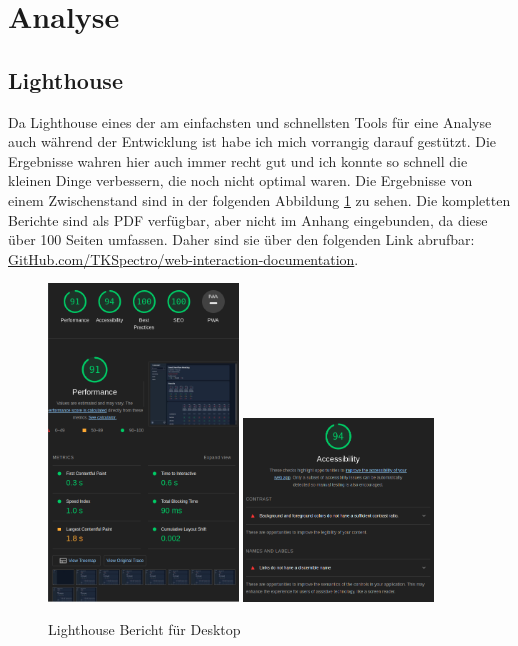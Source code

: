 \section{Analyse}

\subsection{Lighthouse}

Da Lighthouse eines der am einfachsten und schnellsten Tools für eine Analyse auch während der Entwicklung ist habe ich mich vorrangig darauf gestützt. Die Ergebnisse wahren hier auch immer recht gut und ich konnte so schnell die kleinen Dinge verbessern, die noch nicht optimal waren. Die Ergebnisse von einem Zwischenstand sind in der folgenden Abbildung \ref{fig:lighthouse_desktop_1} zu sehen. Die kompletten Berichte sind als PDF verfügbar, aber nicht im Anhang eingebunden, da diese über 100 Seiten umfassen. Daher sind sie über den folgenden Link abrufbar: \href{https://github.com/TKSpectro/web-interaction-documentation/tree/master/Reports}{GitHub.com/TKSpectro/web-interaction-documentation}.

\begin{figure}[th]
    \centering
    \includegraphics[width=0.45\textwidth]{Figures/lighthouse_desktop_1.png}
    \includegraphics[width=0.45\textwidth]{Figures/lighthouse_desktop_2.png}
    \decoRule
    \caption[Turbomeet Lighthouse Bericht Desktop]{Lighthouse Bericht für Desktop}
    \label{fig:lighthouse_desktop_1}
\end{figure}

